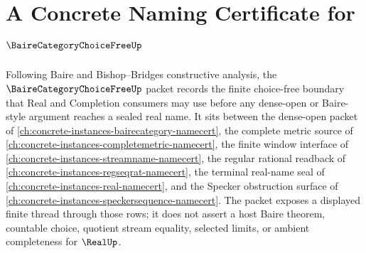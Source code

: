 \chapter{A Concrete Naming Certificate for $\BaireCategoryChoiceFreeUp$}
\label{ch:concrete-instances-baire-category-choice-free-namecert}

Following Baire and Bishop--Bridges constructive analysis, the $\BaireCategoryChoiceFreeUp$ packet records the finite choice-free boundary that Real and Completion consumers may use before any dense-open or Baire-style argument reaches a sealed real name. It sits between the dense-open packet of \autoref{ch:concrete-instances-bairecategory-namecert}, the complete metric source of \autoref{ch:concrete-instances-completemetric-namecert}, the finite window interface of \autoref{ch:concrete-instances-streamname-namecert}, the regular rational readback of \autoref{ch:concrete-instances-regseqrat-namecert}, the terminal real-name seal of \autoref{ch:concrete-instances-real-namecert}, and the Specker obstruction surface of \autoref{ch:concrete-instances-speckersequence-namecert}. The packet exposes a displayed finite thread through those rows; it does not assert a host Baire theorem, countable choice, quotient stream equality, selected limits, or ambient completeness for $\RealUp$.


